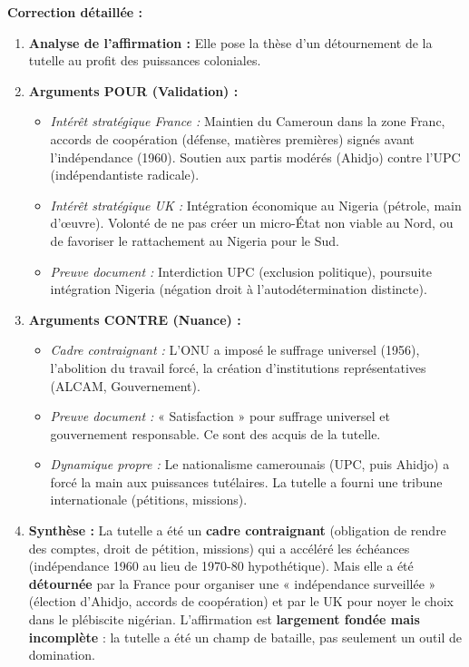 \documentclass[11pt]{article}
\begin{document}
\begin{exoresolu}
\textbf{Correction détaillée :}
\begin{enumerate}
    \item \textbf{Analyse de l'affirmation :} Elle pose la thèse d'un détournement de la tutelle au profit des puissances coloniales.
    \item \textbf{Arguments POUR (Validation) :}
        \begin{itemize}
            \item \textit{Intérêt stratégique France :} Maintien du Cameroun dans la zone Franc, accords de coopération (défense, matières premières) signés avant l'indépendance (1960). Soutien aux partis modérés (Ahidjo) contre l'UPC (indépendantiste radicale).
            \item \textit{Intérêt stratégique UK :} Intégration économique au Nigeria (pétrole, main d'œuvre). Volonté de ne pas créer un micro-État non viable au Nord, ou de favoriser le rattachement au Nigeria pour le Sud.
            \item \textit{Preuve document :} Interdiction UPC (exclusion politique), poursuite intégration Nigeria (négation droit à l'autodétermination distincte).
        \end{itemize}
    \item \textbf{Arguments CONTRE (Nuance) :}
        \begin{itemize}
            \item \textit{Cadre contraignant :} L'ONU a imposé le suffrage universel (1956), l'abolition du travail forcé, la création d'institutions représentatives (ALCAM, Gouvernement).
            \item \textit{Preuve document :} « Satisfaction » pour suffrage universel et gouvernement responsable. Ce sont des acquis de la tutelle.
            \item \textit{Dynamique propre :} Le nationalisme camerounais (UPC, puis Ahidjo) a forcé la main aux puissances tutélaires. La tutelle a fourni une tribune internationale (pétitions, missions).
        \end{itemize}
    \item \textbf{Synthèse :} La tutelle a été un \textbf{cadre contraignant} (obligation de rendre des comptes, droit de pétition, missions) qui a accéléré les échéances (indépendance 1960 au lieu de 1970-80 hypothétique). Mais elle a été \textbf{détournée} par la France pour organiser une « indépendance surveillée » (élection d'Ahidjo, accords de coopération) et par le UK pour noyer le choix dans le plébiscite nigérian. L'affirmation est \textbf{largement fondée mais incomplète} : la tutelle a été un champ de bataille, pas seulement un outil de domination.
\end{enumerate}
\end{exoresolu}
\end{document}

